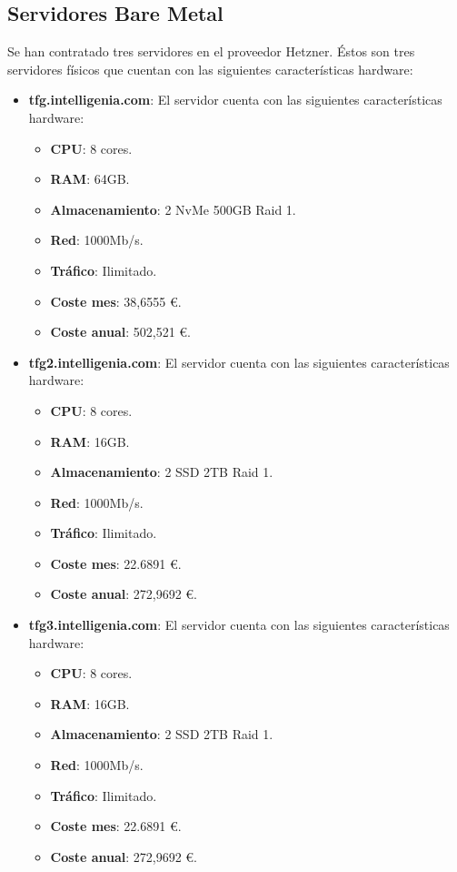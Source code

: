 	\subsection{Servidores Bare Metal}
	\label{servidores_bare_metal}
	
	\begin{text}
		Se han contratado tres servidores en el proveedor Hetzner. Éstos son tres servidores físicos que cuentan con las siguientes características hardware:
		
		\begin{itemize}
			\item \textbf{tfg.intelligenia.com}: El servidor cuenta con las siguientes características hardware:
			
			\begin{itemize}
				\item \textbf{CPU}: 8 cores.
				\item \textbf{RAM}: 64GB.
				\item \textbf{Almacenamiento}: 2 NvMe 500GB Raid 1.
				\item \textbf{Red}: 1000Mb/s.
				\item \textbf{Tráfico}: Ilimitado.
				\item \textbf{Coste mes}: 38,6555 \euro.
				\item \textbf{Coste anual}: 502,521 \euro.
			\end{itemize}
			
			\item \textbf{tfg2.intelligenia.com}: El servidor cuenta con las siguientes características hardware:
			
			\begin{itemize}
				\item \textbf{CPU}: 8 cores.
				\item \textbf{RAM}: 16GB.
				\item \textbf{Almacenamiento}: 2 SSD 2TB Raid 1.
				\item \textbf{Red}: 1000Mb/s.
				\item \textbf{Tráfico}: Ilimitado.
				\item \textbf{Coste mes}: 22.6891 \euro.
				\item \textbf{Coste anual}: 272,9692 \euro.
			\end{itemize}
			
			\item \textbf{tfg3.intelligenia.com}: El servidor cuenta con las siguientes características hardware:
			
			\begin{itemize}
				\item \textbf{CPU}: 8 cores.
				\item \textbf{RAM}: 16GB.
				\item \textbf{Almacenamiento}: 2 SSD 2TB Raid 1.
				\item \textbf{Red}: 1000Mb/s.
				\item \textbf{Tráfico}: Ilimitado.
				\item \textbf{Coste mes}: 22.6891 \euro.
				\item \textbf{Coste anual}: 272,9692 \euro .
			\end{itemize}
		\end{itemize}
		

\end{text}
